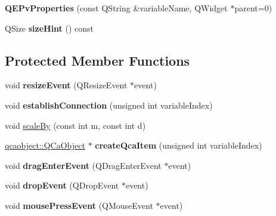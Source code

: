 \begin{DoxyCompactItemize}
\item 
\hypertarget{classQEPvProperties_acb134aeb6c2cc311e4ebb5d8024fbbb3}{
{\bfseries QEPvProperties} (const QString \&variableName, QWidget $\ast$parent=0)}
\label{classQEPvProperties_acb134aeb6c2cc311e4ebb5d8024fbbb3}

\item 
\hypertarget{classQEPvProperties_aa3c4f725936d6732728e5e6f82805ee7}{
QSize {\bfseries sizeHint} () const }
\label{classQEPvProperties_aa3c4f725936d6732728e5e6f82805ee7}

\end{DoxyCompactItemize}
\subsection*{Protected Member Functions}
\begin{DoxyCompactItemize}
\item 
\hypertarget{classQEPvProperties_a6802272c64451df534fbdfbfe7367e8e}{
void {\bfseries resizeEvent} (QResizeEvent $\ast$event)}
\label{classQEPvProperties_a6802272c64451df534fbdfbfe7367e8e}

\item 
\hypertarget{classQEPvProperties_a6a080d60bdb356bc60225cb4632e1f14}{
void {\bfseries establishConnection} (unsigned int variableIndex)}
\label{classQEPvProperties_a6a080d60bdb356bc60225cb4632e1f14}

\item 
void \hyperlink{classQEPvProperties_a9865da78029a71ff6bf9bfe75b22410e}{scaleBy} (const int m, const int d)
\item 
\hypertarget{classQEPvProperties_a628c71832df6a92098cae52e12d1ea03}{
\hyperlink{classqcaobject_1_1QCaObject}{qcaobject::QCaObject} $\ast$ {\bfseries createQcaItem} (unsigned int variableIndex)}
\label{classQEPvProperties_a628c71832df6a92098cae52e12d1ea03}

\item 
\hypertarget{classQEPvProperties_a8bef4578d6d555cb9a02a7800c37d237}{
void {\bfseries dragEnterEvent} (QDragEnterEvent $\ast$event)}
\label{classQEPvProperties_a8bef4578d6d555cb9a02a7800c37d237}

\item 
\hypertarget{classQEPvProperties_a8aa3d0688d94f5fdb30bb5e2737cc917}{
void {\bfseries dropEvent} (QDropEvent $\ast$event)}
\label{classQEPvProperties_a8aa3d0688d94f5fdb30bb5e2737cc917}

\item 
\hypertarget{classQEPvProperties_ad921e380016c61d91ee6e3a28c82d665}{
void {\bfseries mousePressEvent} (QMouseEvent $\ast$event)}
\label{classQEPvProperties_ad921e380016c61d91ee6e3a28c82d665}


\end{DoxyCompactItemize}
